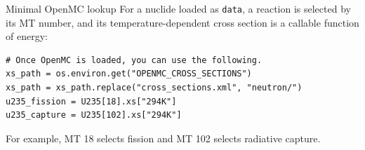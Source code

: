 \begin{handoutcolumns}
\begin{fixedbox}{Minimal OpenMC lookup}
\scriptsize
For a nuclide loaded as \texttt{data}, a reaction is selected by its MT number,
and its temperature-dependent cross section is a callable function of energy:

\begin{verbatim}
# Once OpenMC is loaded, you can use the following.
xs_path = os.environ.get("OPENMC_CROSS_SECTIONS")
xs_path = xs_path.replace("cross_sections.xml", "neutron/")
u235_fission = U235[18].xs["294K"]
u235_capture = U235[102].xs["294K"]
\end{verbatim}

For example, MT 18 selects fission and MT 102 selects radiative capture.
\normalsize
\end{fixedbox}

\end{handoutcolumns}


